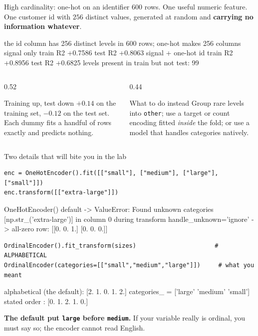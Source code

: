 \documentclass[aspectratio=169]{beamer}
\begin{document}
\begin{frame}[fragile,shrink=8]{High cardinality: one-hot on an identifier}
$600$ rows. One useful numeric feature. One customer id with $256$ distinct
values, generated at random and \textbf{carrying no information whatever}.
\begin{outblk}
the id column has 256 distinct levels in 600 rows; one-hot makes 256 columns
signal only          train R2 +0.7586   test R2 +0.8063
signal + one-hot id  train R2 +0.8956   test R2 +0.6825
levels present in train but not test: 99
\end{outblk}
\begin{columns}[T]
  \begin{column}{0.52\textwidth}
    \begin{alertblock}{Training up, test down}
      \small $+0.14$ on the training set, $-0.12$ on the test set. Each dummy
      fits a handful of rows exactly and predicts nothing.
    \end{alertblock}
  \end{column}
  \begin{column}{0.44\textwidth}
    \begin{block}{What to do instead}
      \small Group rare levels into \texttt{other}; use a target or count
      encoding fitted \emph{inside} the fold; or use a model that handles
      categories natively.
    \end{block}
  \end{column}
\end{columns}
\end{frame}

\begin{frame}[fragile,shrink=8]{Two details that will bite you in the lab}
\begin{lstlisting}
enc = OneHotEncoder().fit([["small"], ["medium"], ["large"], ["small"]])
enc.transform([["extra-large"]])
\end{lstlisting}
\begin{outblk}
OneHotEncoder() default  ->  ValueError: Found unknown categories
   [np.str_('extra-large')] in column 0 during transform
handle_unknown='ignore'  ->  all-zero row:
[[0. 0. 1.]
 [0. 0. 0.]]
\end{outblk}
\begin{lstlisting}
OrdinalEncoder().fit_transform(sizes)                      # ALPHABETICAL
OrdinalEncoder(categories=[["small","medium","large"]])     # what you meant
\end{lstlisting}
\begin{outblk}
alphabetical (the default): [2. 1. 0. 1. 2.]
   categories_ = ['large' 'medium' 'small']
stated order              : [0. 1. 2. 1. 0.]
\end{outblk}
\begin{center}\small
  \textbf{The default put \texttt{large} before \texttt{medium}.} If your
  variable really is ordinal, you must say so; the encoder cannot read
  English.
\end{center}
\end{frame}
\end{document}
